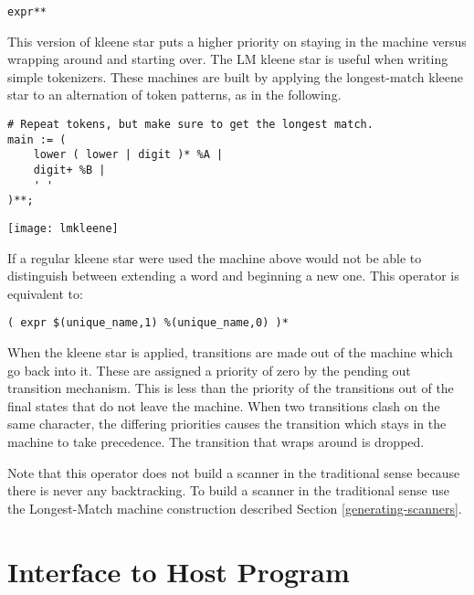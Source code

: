 \documentclass[letterpaper,11pt,oneside]{book}
\newcommand{\verbspace}{\vspace{10pt}}
\newenvironment{inline_code}{\def\baselinestretch{1}\vspace{12pt}\small}{}
\begin{document}
\verb|expr**| 
\verbspace

This version of kleene star puts a higher priority on staying in the
machine versus wrapping around and starting over. The LM kleene star is useful
when writing simple tokenizers.  These machines are built by applying the
longest-match kleene star to an alternation of token patterns, as in the
following.

\verbspace

% GENERATE: lmkleene
% OPT: -p
% %%{
% machine exfinpri;
% action A {}
% action B {}
\begin{inline_code}
\begin{verbatim}
# Repeat tokens, but make sure to get the longest match.
main := (
    lower ( lower | digit )* %
    digit+ %
    ' '
)**;
\end{verbatim}
\end{inline_code}

\begin{center}
\texttt{[image: lmkleene]}
\end{center}

If a regular kleene star were used the machine above would not be able to
distinguish between extending a word and beginning a new one.  This operator is
equivalent to:

\verbspace
\begin{verbatim}
( expr $(unique_name,1) %(unique_name,0) )*
\end{verbatim}
\verbspace

When the kleene star is applied, transitions are made out of the machine which
go back into it. These are assigned a priority of zero by the pending out
transition mechanism. This is less than the priority of the transitions out of
the final states that do not leave the machine. When two transitions clash on
the same character, the differing priorities causes the transition which
stays in the machine to take precedence.  The transition that wraps around is
dropped.

Note that this operator does not build a scanner in the traditional sense
because there is never any backtracking. To build a scanner in the traditional
sense use the Longest-Match machine construction described Section
\ref{generating-scanners}.

\chapter{Interface to Host Program}
\end{document}
